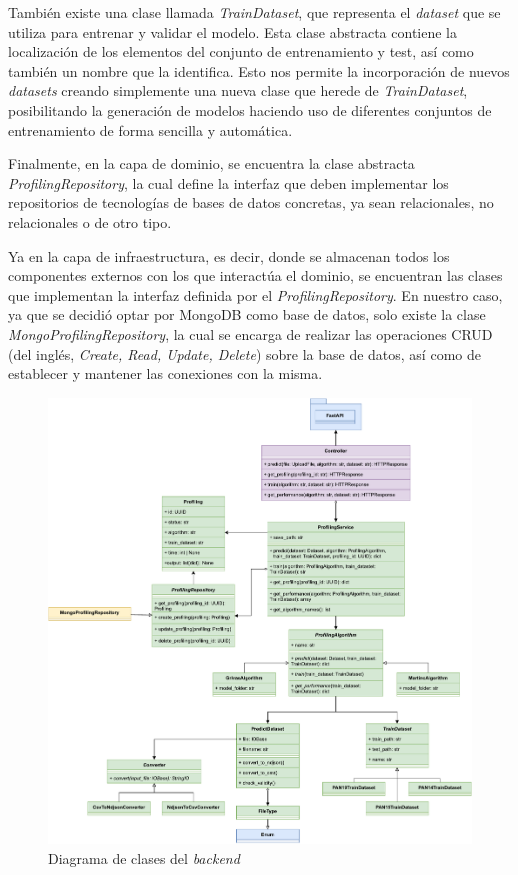\bigskip
También existe una clase llamada \textit{TrainDataset}, que representa
el \textit{dataset} que se utiliza para entrenar y validar el modelo. Esta clase abstracta contiene la localización de los elementos
del conjunto de entrenamiento y test, así como también un nombre que la identifica. Esto nos permite la incorporación de nuevos \textit{datasets} creando simplemente
una nueva clase que herede de \textit{TrainDataset}, posibilitando la generación de modelos haciendo uso de diferentes conjuntos de entrenamiento de forma sencilla y automática.

\bigskip
Finalmente, en la capa de dominio, se encuentra la clase abstracta \textit{ProfilingRepository}, la cual define la interfaz que deben implementar
los repositorios de tecnologías de bases de datos concretas, ya sean relacionales, no relacionales o de otro tipo.

\bigskip
Ya en la capa de infraestructura, es decir, donde se almacenan todos los componentes externos con los que interactúa el dominio, se encuentran las clases que implementan
la interfaz definida por el \textit{ProfilingRepository}. En nuestro caso, ya que se decidió optar por MongoDB como base de datos, solo existe
la clase \textit{MongoProfilingRepository}, la cual se encarga de realizar las operaciones CRUD (del inglés, \textit{Create, Read, Update, Delete}) sobre la base de datos, así
como de establecer y mantener las conexiones con la misma.

\bigskip
\begin{figure}[H]
	\centering
	\includegraphics[width=\textwidth]{diagramas/clases_back.pdf}
	\caption{Diagrama de clases del \textit{backend}}
	\label{fig:clases_backend}
\end{figure}

